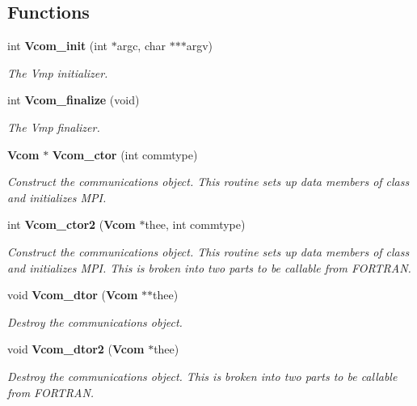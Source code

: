 \subsection*{Functions}
\begin{DoxyCompactItemize}
\item 
int {\bf Vcom\_\-init} (int $\ast$argc, char $\ast$$\ast$$\ast$argv)
\begin{DoxyCompactList}\small\item\em The Vmp initializer. \item\end{DoxyCompactList}\item 
int {\bf Vcom\_\-finalize} (void)
\begin{DoxyCompactList}\small\item\em The Vmp finalizer. \item\end{DoxyCompactList}\item 
{\bf Vcom} $\ast$ {\bf Vcom\_\-ctor} (int commtype)
\begin{DoxyCompactList}\small\item\em Construct the communications object. This routine sets up data members of class and initializes MPI. \item\end{DoxyCompactList}\item 
int {\bf Vcom\_\-ctor2} ({\bf Vcom} $\ast$thee, int commtype)
\begin{DoxyCompactList}\small\item\em Construct the communications object. This routine sets up data members of class and initializes MPI. This is broken into two parts to be callable from FORTRAN. \item\end{DoxyCompactList}\item 
void {\bf Vcom\_\-dtor} ({\bf Vcom} $\ast$$\ast$thee)
\begin{DoxyCompactList}\small\item\em Destroy the communications object. \item\end{DoxyCompactList}\item 
void {\bf Vcom\_\-dtor2} ({\bf Vcom} $\ast$thee)
\begin{DoxyCompactList}\small\item\em Destroy the communications object. This is broken into two parts to be callable from FORTRAN. \item\end{DoxyCompactList}\item 
$$
\end{DoxyCompactItemize}
